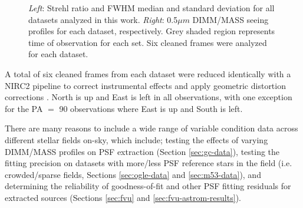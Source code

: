 \documentclass[]{spie}  %
\begin{document}
\begin{figure}[!htb]
 \caption{\footnotesize \textit{Left}: Strehl ratio and FWHM median and standard deviation for all datasets analyzed in this work. \textit{Right}: 0.5$\mu m$ DIMM/MASS seeing profiles for each dataset, respectively. Grey shaded region represents time of observation for each set. Six cleaned frames were analyzed for each dataset. \label{fig:dimmmass_datasets}}
\end{figure}

\noindent A total of six cleaned frames from each dataset were reduced identically with a NIRC2 pipeline to correct instrumental effects \citep{ghez:2008a, lu:2008a} and apply geometric distortion corrections \cite{lu:2008a, service:2016a}. North is up and East is left in all observations, with one exception for the PA $=$ 90 observations where East is up and South is left.

There are many reasons to include a wide range of variable condition data across different stellar fields on-sky, which include; testing the effects of varying DIMM/MASS profiles on PSF extraction (Section \ref{sec:gc-data}), testing the fitting precision on datasets with more/less PSF reference stars in the field (i.e. crowded/sparse fields, Sections \ref{sec:ogle-data} and \ref{sec:m53-data}), and determining the reliability of goodness-of-fit and other PSF fitting residuals for extracted sources (Sections \ref{sec:fvu} and \ref{sec:fvu-astrom-results}).
\end{document}
